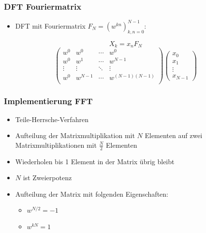 \frame
{
	\frametitle{DFT Fouriermatrix}
	\begin{itemize}
		\item DFT mit Fouriermatrix $F_{N} = (w^{kn})_{k,n=0}^{N-1}$:
	\end{itemize}
	\vspace{5mm}
	\begin{equation*}
	X_{k} = x_{n}F_{N}
	\label{eq:dft fouriermatrix}
	\end{equation*}
	\vspace{3mm}
	\begin{equation*}
	\left( \begin{array}{cccc}
	w^0 & w^0 & \cdots & w^0\\
	w^0 & w^1 & \cdots & w^{N-1}\\
	\vdots & \vdots & \ddots & \vdots\\
	w^0 & w^{N-1} & \cdots & w^{(N-1)(N-1)}\\
	\end{array}\right)
	\left( \begin{array}{c}
	x_0\\
	x_1\\
	\vdots\\
	x_{N-1}
	\end{array}\right)
	\end{equation*}
}

\frame
{
	\frametitle{Implementierung FFT}
	\begin{itemize}
		\item Teile-Herrsche-Verfahren
		\item Aufteilung der Matrixmultiplikation mit $N$ Elementen auf zwei Matrixmultiplikationen mit $\frac{N}{2}$ Elementen
		\item Wiederholen bis 1 Element in der Matrix übrig bleibt
		\item $N$ ist Zweierpotenz
		\item Aufteilung der Matrix mit folgenden Eigenschaften:
		\begin{itemize}
			\item $w^{N/2} = -1$ 
			\item $w^{kN} = 1$
		\end{itemize}
	\end{itemize}

}


